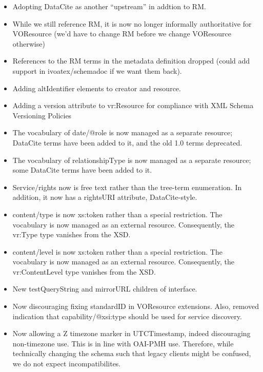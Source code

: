 \documentclass[11pt,a4paper]{ivoa}
\begin{document}
\begin{itemize}
\item Adopting DataCite as another ``upstream'' in addtion to RM.

\item While we still reference RM, it is now no longer informally
authoritative for VOResource (we'd have to change RM before we change
VOResource otherwise)

\item References to the RM terms in the metadata definition dropped
(could add support in ivoatex/schemadoc if we want them back).

\item Adding altIdentifier elements to creator and resource.

\item Adding a version attribute to vr:Resource for compliance with XML
Schema Versioning Policies

\item The vocabulary of date/@role is now managed as a separate
resource; DataCite terms have been added to it, and the old 1.0 terms
deprecated.

\item The vocabulary of relationshipType is now managed as a separate
resource; some DataCite terms have been added to it.

\item Service/rights now is free text rather than the tree-term
enumeration.  In addition, it now has a rightsURI attribute,
DataCite-style.

\item content/type is now xs:token rather than a special restriction.
The vocabulary is now managed as an external resource.
Consequently, the vr:Type type vanishes from the XSD.

\item content/level is now xs:token rather than a special restriction.
The vocabulary is now managed as an external resource.
Consequently, the vr:ContentLevel type vanishes from the XSD.

\item New testQueryString and mirrorURL children of interface.

\item Now discouraging fixing standardID in VOResource extensions.
Also, removed indication that capability/@xsi:type should be used for
service discovery.

\item Now allowing a Z timezone marker in UTCTimestamp, indeed
discouraging non-timezone use.  This is in line with OAI-PMH use.
Therefore, while technically changing the schema such that legacy
clients  might be confused, we do not expect incompatibilites.


\end{itemize}
\end{document}
